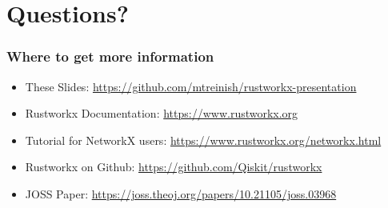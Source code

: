 \documentclass[aspectratio=169,11pt,hyperref={colorlinks=true}]{beamer}
\begin{document}
\section{Questions?}
\begin{frame}
\frametitle{Where to get more information}
    \begin{itemize}
        \item These Slides: \href{https://github.com/mtreinish/rustworkx-presentation}{https://github.com/mtreinish/rustworkx-presentation}
        \item Rustworkx Documentation: \href{https://www.rustworkx.org}{https://www.rustworkx.org}
        \item Tutorial for NetworkX users: \href{https://www.rustworkx.org/networkx.html}{https://www.rustworkx.org/networkx.html}
        \item Rustworkx on Github: \href{https://github.com/Qiskit/rustworkx}{https://github.com/Qiskit/rustworkx}
        \item JOSS Paper: \href{https://joss.theoj.org/papers/10.21105/joss.03968}{https://joss.theoj.org/papers/10.21105/joss.03968}
    \end{itemize}
\end{frame}
\end{document}
